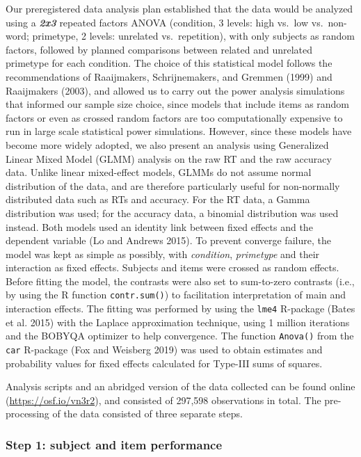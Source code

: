 \documentclass[
]{interact}
\begin{document}
Our preregistered data analysis plan established that the data would be
analyzed using a \textbf{\emph{2x3}} repeated factors ANOVA (condition,
3 levels: high vs.~low vs.~non-word; primetype, 2 levels: unrelated
vs.~repetition), with only subjects as random factors, followed by
planned comparisons between related and unrelated primetype for each
condition. The choice of this statistical model follows the
recommendations of Raaijmakers, Schrijnemakers, and Gremmen (1999) and
Raaijmakers (2003), and allowed us to carry out the power analysis
simulations that informed our sample size choice, since models that
include items as random factors or even as crossed random factors are
too computationally expensive to run in large scale statistical power
simulations. However, since these models have become more widely
adopted, we also present an analysis using Generalized Linear Mixed
Model (GLMM) analysis on the raw RT and the raw accuracy data. Unlike
linear mixed-effect models, GLMMs do not assume normal distribution of
the data, and are therefore particularly useful for non-normally
distributed data such as RTs and accuracy. For the RT data, a Gamma
distribution was used; for the accuracy data, a binomial distribution
was used instead. Both models used an identity link between fixed
effects and the dependent variable (Lo and Andrews 2015). To prevent
converge failure, the model was kept as simple as possibly, with
\emph{condition}, \emph{primetype} and their interaction as fixed
effects. Subjects and items were crossed as random effects. Before
fitting the model, the contrasts were also set to sum-to-zero contrasts
(i.e., by using the R function \texttt{contr.sum()}) to facilitation
interpretation of main and interaction effects. The fitting was
performed by using the \texttt{lme4} R-package (Bates et al. 2015) with
the Laplace approximation technique, using 1 million iterations and the
BOBYQA optimizer to help convergence. The function \texttt{Anova()} from
the \texttt{car} R-package (Fox and Weisberg 2019) was used to obtain
estimates and probability values for fixed effects calculated for
Type-III sums of squares.

Analysis scripts and an abridged version of the data collected can be
found online (\url{https://osf.io/vn3r2}), and consisted of 297,598
observations in total. The pre-processing of the data consisted of three
separate steps.

\subsubsection{Step 1: subject and item
performance}\label{sec-exp1-analysis-performance}
\end{document}
